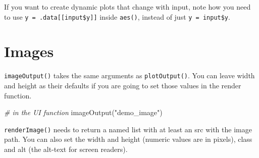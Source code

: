 \documentclass[
  oneside]{book}
\newenvironment{Shaded}{\begin{snugshade}}{\end{snugshade}}
\newcommand{\AttributeTok}[1]{\textcolor[rgb]{0.77,0.63,0.00}{#1}}
\newcommand{\CommentTok}[1]{\textcolor[rgb]{0.56,0.35,0.01}{\textit{#1}}}
\newcommand{\ConstantTok}[1]{\textcolor[rgb]{0.00,0.00,0.00}{#1}}
\newcommand{\FunctionTok}[1]{\textcolor[rgb]{0.00,0.00,0.00}{#1}}
\newcommand{\NormalTok}[1]{#1}
\newcommand{\OtherTok}[1]{\textcolor[rgb]{0.56,0.35,0.01}{#1}}
\newcommand{\SpecialCharTok}[1]{\textcolor[rgb]{0.00,0.00,0.00}{#1}}
\newcommand{\StringTok}[1]{\textcolor[rgb]{0.31,0.60,0.02}{#1}}
\begin{document}
\begin{Shaded}
\end{Shaded}

\begin{warning}
If you want to create dynamic plots that change with input, note how you need to use \texttt{y\ =\ .data{[}{[}input\$y{]}{]}} inside \texttt{aes}\texttt{()}, instead of just \texttt{y\ =\ input\$y}.

\end{warning}

\hypertarget{images}{%
\section{Images}\label{images}}

\texttt{imageOutput}\texttt{()} takes the same arguments as \texttt{plotOutput}\texttt{()}. You can leave \AttributeTok{width} and \AttributeTok{height} as their defaults if you are going to set those values in the render function.

\begin{Shaded}
\begin{Highlighting}[]
\CommentTok{\# in the UI function}
\FunctionTok{imageOutput}\NormalTok{(}\StringTok{"demo\_image"}\NormalTok{)}
\end{Highlighting}
\end{Shaded}

\texttt{renderImage}\texttt{()} needs to return a named list with at least an \AttributeTok{src} with the image path. You can also set the \AttributeTok{width} and \AttributeTok{height} (numeric values are in pixels), \AttributeTok{class} and \AttributeTok{alt} (the alt-text for screen readers).
\end{document}
